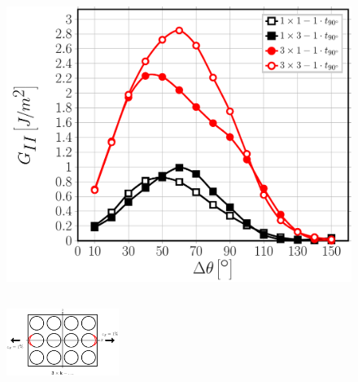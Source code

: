 \documentclass[first,firstsupp,lastsupp,last,hyperref,table]{ETHclass}
\begin{document}
\begin{frame}
\begin{columns}[c]
\begin{column}{0.5\textwidth}
\begin{figure}
\includegraphics[width=\columnwidth]{nxk-1-vf60-GII-strainmagni3.pdf}
\end{figure}
\end{column}
\end{columns}
\vspace{-0.25cm}
\begin{figure}
\centering
\includegraphics[width=0.325\textwidth]{twofibers-sameside-strainmagni3.pdf}
\end{figure}
\end{frame}

\addtocounter{framenumber}{-1}
\end{document}
